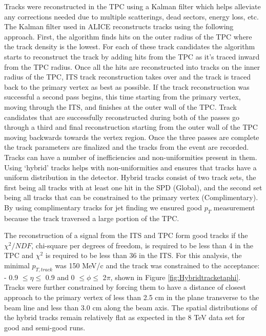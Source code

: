 Tracks were reconstructed in the TPC using a Kalman filter which helps alleviate any corrections needed due to multiple scatterings, dead sectors, energy loss, etc.  The Kalman filter used in ALICE reconstructs tracks using the following approach.  First, the algorithm finds hits on the outer radius of the TPC where the track density is the lowest.  For each of these track candidates the algorithm starts to reconstruct the track by adding hits from the TPC as it's traced inward from the TPC radius.   Once all the hits are reconstructed into tracks on the inner radius of the TPC, ITS track reconstruction takes over and the track is traced back to the primary vertex as best as possible.  If the track reconstruction was successful a second pass begins, this time starting from the primary vertex, moving through the ITS, and finishes at the outer wall of the TPC.  Track candidates that are successfully reconstructed during both of the passes go through a third and final reconstruction starting from the outer wall of the TPC moving backwards towards the vertex region.  Once the three passes are complete the track parameters are finalized and the tracks from the event are recorded. 
Tracks can have a number of inefficiencies and non-uniformities present in them.  Using `hybrid' tracks helps with non-uniformities and ensures that tracks have a uniform distribution in the detector.  Hybrid tracks consist of two track sets, the first being all tracks with at least one hit in the SPD (Global), and the second set being all tracks that can be constrained to the primary vertex (Complimentary).  By using complimentary tracks for jet finding we ensured good $p_{T}$ measurement because the track traversed a large portion of the TPC.  

The reconstruction of a signal from the ITS and TPC form good tracks if the $\chi^{2}/NDF$, chi-square per degrees of freedom, is required to be less than 4 in the TPC and $\chi^{2}$ is required to be less than 36 in the ITS. For this analysis, the minimal $p_{T, track}$ was 150 MeV/c and the track was constrained to the acceptance: - 0.9 $\leq \eta \leq$ 0.9 and 0 $\leq \phi \leq$ 2$\pi$, shown in Figure \ref{fig:Hybridtracketaphi}. Tracks were further constrained by forcing them to have a distance of closest approach to the primary vertex of less than 2.5 cm in the plane transverse to the beam line and less than 3.0 cm along the beam axis.  The spatial distributions of the hybrid tracks remain relatively flat as expected in the 8 TeV data set for good and semi-good runs.

